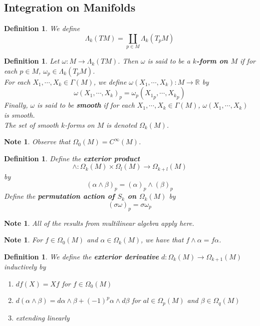 \documentclass[12pt]{amsart}
\newtheorem{defn}[thm]{Definition}
\newtheorem{note}[thm]{Note}
\newcommand{\al}{\alpha}
\newcommand{\Gam}{\Gamma}
\newcommand{\bet}{\beta}
\newcommand{\Lam}{\Lambda}
\newcommand{\sig}{\sigma}
\newcommand{\om}{\omega}
\newcommand{\Om}{\Omega}
\newcommand{\R}{\mathbb{R}}
\begin{document}
	
	
	

	
	\newpage	
	\subsection{Integration on Manifolds}
	
	\begin{defn}
		We define $$\Lam_k (TM) = \coprod_{p \in M} \Lam_k(T_p M)$$
	\end{defn}
	
	\begin{defn}
		Let $\om: M \rightarrow \Lam_k (TM)$. Then $\om$ is said to be a \textbf{$k$-form on $M$} if for each $p \in M$, $\om_p \in \Lam_k(T_pM)$.\\
		For each $X_1, \cdots, X_k \in \Gam(M)$, we define $\om(X_1, \cdots, X_k) : M \rightarrow \R$ by $$\om(X_1, \cdots, X_k)_p = \om_p({X_1}_p, \cdots, {X_k}_p)$$
		Finally, $\om$ is said to be \textbf{smooth} if for each $X_1, \cdots, X_k \in \Gam(M)$, $\om(X_1, \cdots, X_k)$ is smooth.\\
		The set of smooth $k$-forms on $M$ is denoted $\Om_k(M)$.\\
	\end{defn} 

	\begin{note}
		Observe that $\Om_0(M) = C^{\infty}(M)$.
	\end{note}

	\begin{defn}
		Define the \textbf{exterior product} $$\wedge: \Om_k(M) \times \Om_l(M) \rightarrow \Om_{k+l}(M) $$ by $$(\al \wedge \beta)_p = (\al)_p \wedge (\beta)_p$$
		Define the \textbf{permutation action of $S_k$ on $\Om_k(M)$} by $$(\sig \om)_p = \sig \om_p$$
	\end{defn}
	
	\begin{note}
		All of the results from multilinear algebra apply here.
	\end{note}

	\begin{note}
		For $f \in \Om_0(M)$ and $\al \in \Om_k(M)$, we have that $f \wedge \al = f \al$.
	\end{note}

	\begin{defn}
		We define the \textbf{exterior derivative} $d: \Om_k(M) \rightarrow \Om_{k+1}(M)$ inductively by 
		\begin{enumerate}
			\item $df(X) = Xf$ for $f \in \Om_0(M)$
			\item $d(\al \wedge \bet) = d\al \wedge \bet + (-1)^p \al \wedge d\bet$ for $al \in \Om_p(M)$ and $\bet \in \Om_q(M)$
			\item extending linearly
		\end{enumerate}
	\end{defn}
\end{document}
